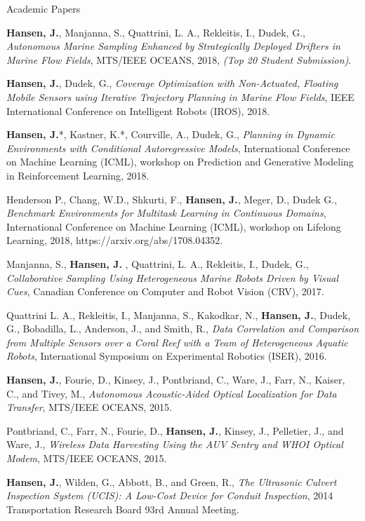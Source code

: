 \documentclass{resume} %
\begin{document}
\begin{rSection}{Academic Papers}

\textbf{Hansen, J.}, Manjanna, S.,  Quattrini, L. A., Rekleitis, I., Dudek, G., \textit{Autonomous Marine Sampling Enhanced by Strategically Deployed Drifters in Marine Flow Fields}, MTS/IEEE OCEANS, 2018, \emph{{(Top 20 Student Submission)}}.

\textbf{Hansen, J.}, Dudek, G., \textit{Coverage Optimization with Non-Actuated, Floating Mobile Sensors using Iterative Trajectory Planning in Marine Flow Fields}, IEEE International Conference on Intelligent Robots (IROS), 2018.

\textbf{Hansen, J.}*, Kastner, K.*, Courville, A., Dudek, G.,  \textit{Planning in Dynamic Environments with Conditional Autoregressive Models}, International Conference on Machine Learning (ICML), workshop on Prediction and Generative Modeling in Reinforcement Learning, 2018.

Henderson P., Chang, W.D., Shkurti, F., \textbf{Hansen, J.}, Meger, D., Dudek G., 
\textit{Benchmark Environments for Multitask Learning in Continuous Domains}, International Conference on Machine Learning (ICML), workshop on Lifelong Learning, 2018, https://arxiv.org/abs/1708.04352. 

Manjanna, S., \textbf{ Hansen, J. }, Quattrini, L. A., Rekleitis, I., Dudek, G., 
\textit{Collaborative Sampling Using Heterogeneous Marine Robots Driven by Visual Cues}, Canadian Conference on Computer and Robot Vision (CRV), 2017. 
                
Quattrini L. A., Rekleitis, I., Manjanna, S., Kakodkar, N., \textbf{Hansen, J.},   Dudek, G.,  Bobadilla, L.,  Anderson, J., and Smith, R.,
            \textit{Data Correlation and Comparison from Multiple Sensors over a Coral Reef with a Team of Heterogeneous Aquatic Robots},
             International Symposium on Experimental Robotics (ISER),
              2016.

\textbf{Hansen, J.}, Fourie, D., Kinsey, J., Pontbriand, C., Ware, J., Farr, N., Kaiser, C., and Tivey, M., \textit{Autonomous Acoustic-Aided Optical Localization for Data Transfer}, MTS/IEEE OCEANS, 2015.

Pontbriand, C., Farr, N., Fourie, D., \textbf{Hansen, J.},  Kinsey, J., Pelletier, J., and Ware, J., 
 \textit{Wireless Data Harvesting Using the AUV Sentry and WHOI Optical Modem}, MTS/IEEE OCEANS, 2015.

\textbf{Hansen, J.}, Wilden, G., Abbott, B., and Green, R., \textit{The Ultrasonic Culvert
Inspection System (UCIS): A Low-Cost Device for Conduit Inspection}, 2014 Transportation
Research Board 93rd Annual Meeting. 
\end{rSection}
\newpage
\end{document}
